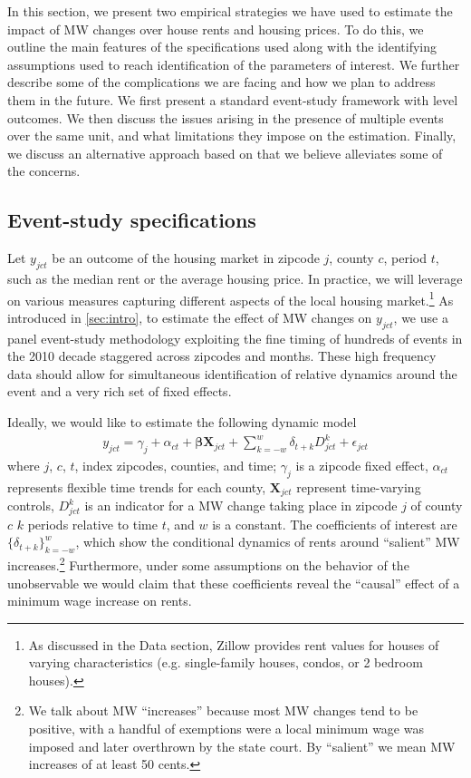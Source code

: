 
In this section, we present two empirical strategies we have used to estimate the impact of MW changes over house rents and housing prices. To do this, we outline the main features of the specifications used along with the identifying assumptions used to reach identification of the parameters of interest. We further describe some of the complications we are facing and how we plan to address them in the future. We first present a standard event-study framework with level outcomes. We then discuss the issues arising in the presence of multiple events over the same unit, and what limitations they impose on the estimation. Finally, we discuss an alternative approach based on  that we believe alleviates some of the concerns.

\subsection{Event-study specifications}\label{subsec:empirical_strategy/event-study}

    Let $y_{jct}$ be an outcome of the housing market in zipcode $j$, county $c$, period $t$, such as the median rent or the average housing price. In practice, we will leverage on various measures capturing different aspects of the local housing market.\footnote{As discussed in the Data section, Zillow provides rent values for houses of varying characteristics (e.g. single-family houses, condos, or 2 bedroom houses).} As introduced in \autoref{sec:intro}, to estimate the effect of MW changes on $y_{jct}$, we use a panel event-study methodology exploiting the fine timing of hundreds of events in the 2010 decade staggered across zipcodes and months. These high frequency data should allow for simultaneous identification of relative dynamics around the event and a very rich set of fixed effects.
    
    Ideally, we would like to estimate the following dynamic model
    \begin{equation}\label{eq:ideal-event-study}
        \begin{split}
            y_{jct} = \gamma_{j} + \alpha_{ct} + \boldsymbol{\beta} \boldsymbol{X}_{jct} + \sum_{k = -w}^{w}\delta_{t + k} D_{jct}^k + \epsilon_{jct} 
        \end{split}   
    \end{equation}
    where $j$, $c$, $t$, index zipcodes, counties, and time; $\gamma_{j}$ is a zipcode fixed effect, $\alpha_{ct}$ represents flexible time trends for each county, $\boldsymbol{X}_{jct}$ represent time-varying controls, $D_{jct}^k$ is an indicator for a MW change taking place in zipcode $j$ of county $c$ $k$ periods relative to time $t$, and $w$ is a constant. The coefficients of interest are $\{\delta_{t + k}\}_{k=-w}^w$, which show the conditional dynamics of rents around ``salient'' MW increases.\footnote{We talk about MW ``increases'' because most MW changes tend to be positive, with a handful of exemptions were a local minimum wage was imposed and later overthrown by the state court. By ``salient'' we mean MW increases of at least 50 cents.} Furthermore, under some assumptions on the behavior of the unobservable we would claim that these coefficients reveal the ``causal'' effect of a minimum wage increase on rents.

